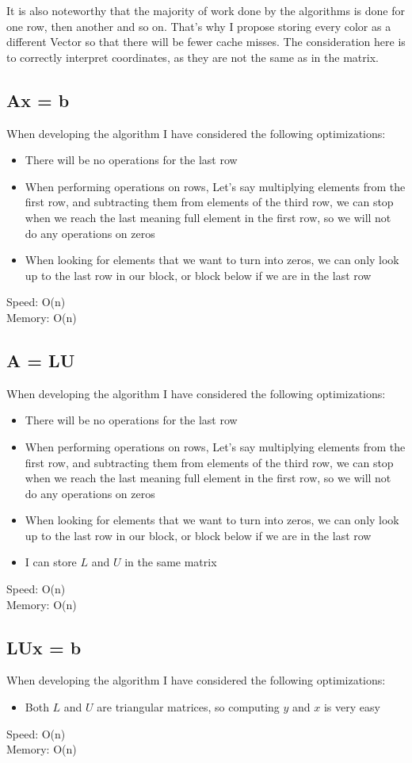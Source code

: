 \documentclass{article}
\begin{document}
It is also noteworthy that the majority of work done by the algorithms is done for one row, then another and so on. That's why I propose storing every color as a different Vector so that there will be fewer cache misses. The consideration here is to correctly interpret coordinates, as they are not the same as in the matrix.
\subsection*{Ax = b}
When developing the algorithm I have considered the following optimizations:
\begin{itemize}
    \item{There will be no operations for the last row}
    \item{When performing operations on rows, Let's say multiplying elements from the first row, and subtracting them from elements of the third row, we can stop when we reach the last meaning full element in the first row, so we will not do any operations on zeros}
    \item {When looking for elements that we want to turn into zeros, we can only look up to the last row in our block, or block below if we are in the last row}
\end{itemize}
Speed: O(n)\\
Memory: O(n)
\subsection*{A = LU}
When developing the algorithm I have considered the following optimizations:
\begin{itemize}
    \item{There will be no operations for the last row}
    \item{When performing operations on rows, Let's say multiplying elements from the first row, and subtracting them from elements of the third row, we can stop when we reach the last meaning full element in the first row, so we will not do any operations on zeros}
    \item {When looking for elements that we want to turn into zeros, we can only look up to the last row in our block, or block below if we are in the last row}
    \item {I can store $L$ and $U$ in the same matrix} 
\end{itemize}
Speed: O(n)\\
Memory: O(n)
\subsection*{LUx = b}
When developing the algorithm I have considered the following optimizations:
\begin{itemize}
    \item{Both $L$ and $U$ are triangular matrices, so computing $y$ and $x$ is very easy}
\end{itemize}
Speed: O(n)\\
Memory: O(n)
\newpage
\end{document}
